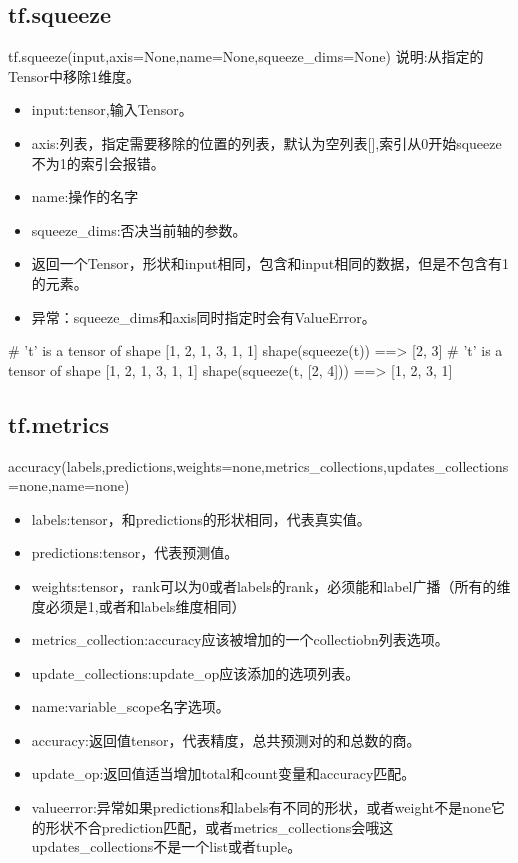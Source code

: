 \subsection{tf.squeeze}
tf.squeeze(input,axis=None,name=None,squeeze\_dims=None)
说明:从指定的Tensor中移除1维度。
\begin{itemize}
\item input:tensor,输入Tensor。
\item axis:列表，指定需要移除的位置的列表，默认为空列表[],索引从0开始squeeze不为1的索引会报错。
\item name:操作的名字
\item squeeze\_dims:否决当前轴的参数。
\item 返回一个Tensor，形状和input相同，包含和input相同的数据，但是不包含有1的元素。
\item 异常：squeeze\_dims和axis同时指定时会有ValueError。
\end{itemize}
\# 't' is a tensor of shape [1, 2, 1, 3, 1, 1]\newline
shape(squeeze(t)) ==> [2, 3]\newline
\# 't' is a tensor of shape [1, 2, 1, 3, 1, 1]\newline
shape(squeeze(t, [2, 4])) ==> [1, 2, 3, 1]\newline
\subsection{tf.metrics}
accuracy(labels,predictions,weights=none,metrics\_collections,updates\_collections=none,name=none)
\begin{itemize}
	\item labels:tensor，和predictions的形状相同，代表真实值。
	\item predictions:tensor，代表预测值。
	\item weights:tensor，rank可以为0或者labels的rank，必须能和label广播（所有的维度必须是1,或者和labels维度相同）
	\item metrics\_collection:accuracy应该被增加的一个collectiobn列表选项。
	\item update\_collections:update\_op应该添加的选项列表。
	\item name:variable\_scope名字选项。
	\item accuracy:返回值tensor，代表精度，总共预测对的和总数的商。
	\item update\_op:返回值适当增加total和count变量和accuracy匹配。
	\item valueerror:异常如果predictions和labels有不同的形状，或者weight不是none它的形状不合prediction匹配，或者metrics\_collections会哦这updates\_collections不是一个list或者tuple。
\end{itemize}
